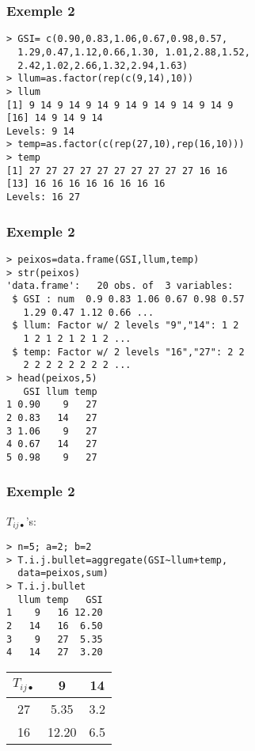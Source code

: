 \documentclass[12pt,t]{beamer}
\theoremstyle{plain}
\theoremstyle{definition}
\begin{document}
\begin{frame}[fragile]
\frametitle{Exemple 2}

\begin{verbatim}
> GSI= c(0.90,0.83,1.06,0.67,0.98,0.57,
  1.29,0.47,1.12,0.66,1.30, 1.01,2.88,1.52,
  2.42,1.02,2.66,1.32,2.94,1.63)
> llum=as.factor(rep(c(9,14),10))
> llum
[1] 9 14 9 14 9 14 9 14 9 14 9 14 9 14 9
[16] 14 9 14 9 14
Levels: 9 14
> temp=as.factor(c(rep(27,10),rep(16,10)))
> temp
[1] 27 27 27 27 27 27 27 27 27 27 16 16 
[13] 16 16 16 16 16 16 16 16
Levels: 16 27
\end{verbatim}


\end{frame}



\begin{frame}[fragile]
\frametitle{Exemple 2}
\vspace*{-2ex}

\begin{verbatim}
> peixos=data.frame(GSI,llum,temp)
> str(peixos)
'data.frame':	20 obs. of  3 variables:
 $ GSI : num  0.9 0.83 1.06 0.67 0.98 0.57 
   1.29 0.47 1.12 0.66 ...
 $ llum: Factor w/ 2 levels "9","14": 1 2 
   1 2 1 2 1 2 1 2 ...
 $ temp: Factor w/ 2 levels "16","27": 2 2 
   2 2 2 2 2 2 2 2 ...
> head(peixos,5)
   GSI llum temp
1 0.90    9   27
2 0.83   14   27
3 1.06    9   27
4 0.67   14   27
5 0.98    9   27
\end{verbatim}
\end{frame}



\begin{frame}[fragile]
\frametitle{Exemple 2}
\vspace*{-2ex}

$T_{ij\bullet}$'s:
\vspace*{-1ex}

\begin{verbatim}
> n=5; a=2; b=2
> T.i.j.bullet=aggregate(GSI~llum+temp,
  data=peixos,sum)
> T.i.j.bullet
  llum temp   GSI
1    9   16 12.20
2   14   16  6.50
3    9   27  5.35
4   14   27  3.20
\end{verbatim}
\begin{center}
\begin{tabular}{c|cc}
$T_{ij\bullet}$ & 9 & 14\\ \hline
27 &  5.35 & 3.2\\
16 &12.20 & 6.5
\end{tabular}
\end{center}

\end{frame}
\end{document}
